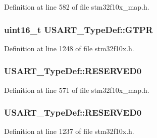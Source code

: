 Definition at line 582 of file stm32f10x\+\_\+map.\+h.

\subsubsection[{\texorpdfstring{G\+T\+PR}{GTPR}}]{ {\bf uint16\+\_\+t} U\+S\+A\+R\+T\+\_\+\+Type\+Def\+::\+G\+T\+PR}\hypertarget{struct_u_s_a_r_t___type_def_abe51502097b1fd281d0a2a1b157d769e}{}\label{struct_u_s_a_r_t___type_def_abe51502097b1fd281d0a2a1b157d769e}


Definition at line 1248 of file stm32f10x.\+h.

\subsubsection[{\texorpdfstring{R\+E\+S\+E\+R\+V\+E\+D0}{RESERVED0}}]{ U\+S\+A\+R\+T\+\_\+\+Type\+Def\+::\+R\+E\+S\+E\+R\+V\+E\+D0}\hypertarget{struct_u_s_a_r_t___type_def_a2c8f2f7adfbbbeb6a645cca18d9e9e02}{}\label{struct_u_s_a_r_t___type_def_a2c8f2f7adfbbbeb6a645cca18d9e9e02}


Definition at line 571 of file stm32f10x\+\_\+map.\+h.

\subsubsection[{\texorpdfstring{R\+E\+S\+E\+R\+V\+E\+D0}{RESERVED0}}]{ U\+S\+A\+R\+T\+\_\+\+Type\+Def\+::\+R\+E\+S\+E\+R\+V\+E\+D0}\hypertarget{struct_u_s_a_r_t___type_def_a84ccd64c74c8dbc78b94172ce759de10}{}\label{struct_u_s_a_r_t___type_def_a84ccd64c74c8dbc78b94172ce759de10}


Definition at line 1237 of file stm32f10x.\+h.

